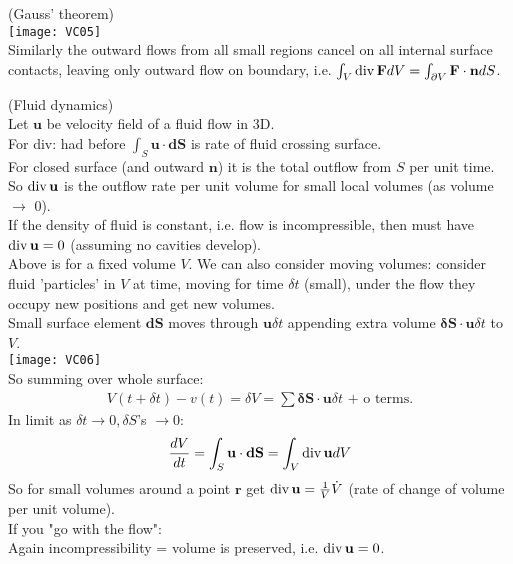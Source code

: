 \documentclass[a4paper]{article}
\begin{document}
\begin{eg} (Gauss' theorem)\\
\texttt{[image: VC05]}\\
Similarly the outward flows from all small regions cancel on all internal surface contacts, leaving only outward flow on boundary, i.e. $\int_V \operatorname{div}\mathbf{F}dV = \int_{\partial V} \mathbf{F}\cdot\mathbf{n}dS$.\\
\end{eg}

\begin{eg} (Fluid dynamics)\\
Let $\mathbf{u}$ be velocity field of a fluid flow in 3D.\\
For div: had before $\int_S \mathbf{u}\cdot\mathbf{dS}$ is rate of fluid crossing surface.\\
For closed surface (and outward $\mathbf{n}$) it is the total outflow from $S$ per unit time.\\
So $\operatorname{div} \mathbf{u}$ is the outflow rate per unit volume for small local volumes (as volume $\to$ 0).\\
If the density of fluid is constant, i.e. flow is incompressible, then must have $\operatorname{div} \mathbf{u}=0$ (assuming no cavities develop).\\
Above is for a fixed volume $V$. We can also consider moving volumes: consider fluid 'particles' in $V$ at time, moving for time $\delta t$ (small), under the flow they occupy new positions and get new volumes.\\
Small surface element $\mathbf{dS}$ moves through $\mathbf{u}\delta t$ appending extra volume $\mathbf{\delta S}\cdot\mathbf{u}\delta t$ to $V$.\\
\texttt{[image: VC06]}\\
So summing over whole surface:
\begin{equation*}
\begin{aligned}
V\left(t+\delta t\right)-v\left(t\right)=\delta V = \sum \mathbf{\delta S}\cdot \mathbf{u}\delta t \text{  + o terms}.
\end{aligned}
\end{equation*}
In limit as $\delta t\to 0, \delta S$'s $\to 0$:
\begin{equation*}
\begin{aligned}
\frac{dV}{dt} = \int_S \mathbf{u}\cdot\mathbf{dS}=\int_V \operatorname{div} \mathbf{u} dV
\end{aligned}
\end{equation*}
So for small volumes around a point $\mathbf{r}$ get $\operatorname{div} \mathbf{u}=\frac{1}{V}\dot{V}$ (rate of change of volume per unit volume).\\
If you "go with the flow":\\
Again incompressibility = volume is preserved, i.e. $\operatorname{div} \mathbf{u}=0$.


\end{eg}
\end{document}
